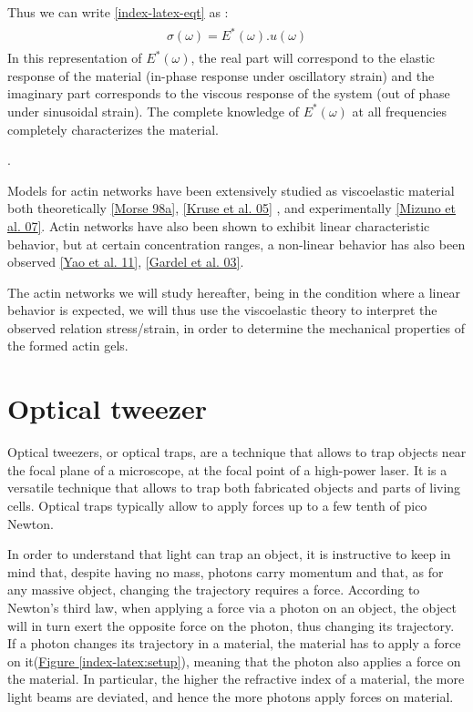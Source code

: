 \documentclass[A4paperpaper,11pt,english]{sphinxmanual}
\begin{document}
Thus we can write \eqref{index-latex-eqt} as :
\label{index-latex:equation-eqa17}\begin{gather}
\begin{split}\sigma(\omega) = E^*(\omega).u(\omega)\end{split}\label{index-latex-eqa17}
\end{gather}
In this representation of \(E^*(\omega)\), the real part will correspond to
the elastic response of the material (in-phase response
under oscillatory strain) and the imaginary part corresponds to the viscous response
of the system (out of phase under sinusoidal strain). The complete knowledge of
\(E^*(\omega)\) at all frequencies completely characterizes the material.

.

Models for actin networks have been extensively studied as viscoelastic material
both theoretically {\hyperref[index-latex:morse1998a]{{[}Morse 98a{]}}}, {\hyperref[index-latex:kruse2005]{{[}Kruse et al. 05{]}}} , and  experimentally
{\hyperref[index-latex:mizuno2007]{{[}Mizuno et al. 07{]}}}. Actin networks have also been shown to exhibit linear characteristic behavior,
but at certain concentration ranges, a non-linear behavior has also been observed {\hyperref[index-latex:yao2011]{{[}Yao et al. 11{]}}}, {\hyperref[index-latex:gardel2003]{{[}Gardel et al. 03{]}}}.

The actin networks we will study hereafter, being in the condition where a linear behavior is expected, we will thus use the viscoelastic theory to interpret the
observed relation stress/strain, in order to determine the mechanical properties
of the formed actin gels.


\section{Optical tweezer}
\label{index-latex:id77}\label{index-latex:optical-tweezer}
Optical tweezers, or optical traps, are a technique that allows to trap objects
near the focal plane of a microscope, at the focal point of a high-power laser.
It is a versatile technique that allows to trap both fabricated objects and
parts of living cells. Optical traps typically allow to apply forces up to a few tenth of
pico Newton.

In order to understand that light can trap an object, it is instructive to keep in mind
that, despite having no mass, photons carry momentum and that, as for any massive
object, changing the trajectory requires a force.  According to Newton's third
law, when applying a force via a photon on an object, the object will in turn
exert the opposite force on the photon, thus changing its trajectory. If a photon changes its trajectory in a material, the material has to apply a
force on it(\hyperref[index-latex:setup]{Figure  \ref*{index-latex:setup}}), meaning that the photon also applies a force on the
material. In particular, the higher the refractive index of a material, the
more light beams are deviated, and hence the more photons apply forces on
material.
\end{document}
